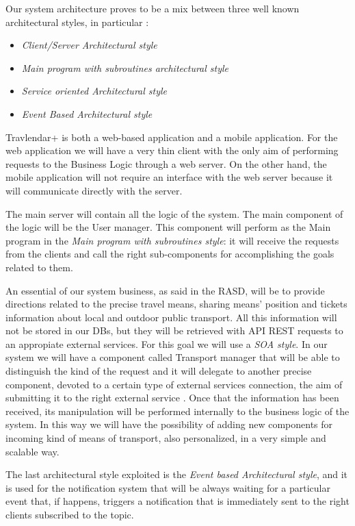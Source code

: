\newpage
{}
Our system architecture proves to be a mix between three well known architectural styles, in particular : 

\begin{itemize}
\setlength{\leftskip}{0.5cm}
\item \emph{Client/Server Architectural style}
\item \emph{Main program with subroutines architectural style}
\item \emph{Service oriented Architectural style}
\item \emph{Event Based Architectural style}
\end{itemize}

Travlendar+ is both a web-based application and a mobile application. For the web application we will have a very thin client with the only aim of performing requests to the Business Logic through a web server.
On the other hand, the mobile application will not require an interface with the web server because it will communicate directly with the server.
\\\par
The main server will contain all the logic of the system. The main component of the logic will be the User manager. This component will perform as the Main program in the \emph{Main program with subroutines style}: it will receive the requests from the clients and call the right sub-components for accomplishing the goals related to them.
\\\par
An essential of our system business, as said in the RASD, will be to provide directions related to the precise travel means, sharing means’ position and tickets information about local and outdoor public transport. All this information will not be stored in our DBs, but they will be retrieved with API REST requests to an appropiate external services. For this goal we will use a \emph{SOA style}. 
In our system we will have a component called Transport manager that will be able to distinguish the kind of the request and it will delegate to another precise component, devoted to a certain type of external services connection, the aim of submitting it to the right external service . Once that the information has been received, its manipulation will be performed internally to the business logic of the system. In this way we will have the possibility of adding new components for incoming kind of means of transport, also personalized, in a very simple and scalable way.
\\\par
The last architectural style exploited is the \emph{Event based Architectural style}, and it is used for the notification system that will be always waiting for a particular event that, if happens, triggers a notification that is immediately sent to the right clients subscribed to the topic. 


